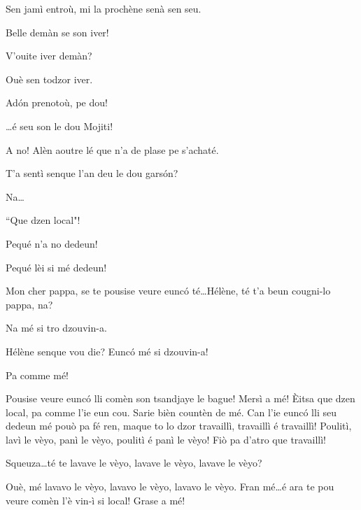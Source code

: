 \begin{drama}
\Louisspeaks Sen jamì entroù, mi la prochène senà sen seu.

\Pierrespeaks Belle demàn se son iver!

\Louisspeaks{} V'ouite iver demàn?

\Bertaspeaks Ouè sen todzor iver.

\Pierrespeaks Ad\'on prenotoù, pe dou!


\Helenespeaks \ldots é seu son le dou Mojiti!


\Pierrespeaks A no! Alèn aoutre lé que n'a de plase pe s'achaté.


\Bertaspeaks{} T'a sentì senque l'an deu le dou gars\'on?

\Helenespeaks Na\ldots

\Bertaspeaks{} ``Que dzen local"!

\Helenespeaks{} Pequé n'a no dedeun!

\Bertaspeaks{} Pequé lèi si mé dedeun!


\Bertaspeaks Mon cher pappa, se te pousise veure eunc\'o té\ldots Hélène, té t'a beun cougni-lo pappa, na?

\Helenespeaks Na mé si tro dzouvin-a.

\Bertaspeaks Hélène senque vou die? Eunc\'o mé si dzouvin-a!

\Helenespeaks Pa comme mé!

\Bertaspeaks{} Pousise veure eunc\'o lli comèn son tsandjaye le bague! Mersì a mé! \`Eitsa que dzen local, pa comme l'ie eun cou. Sarie bièn countèn de mé. Can l'ie eunc\'o lli seu dedeun mé pouò pa fé ren, maque to lo dzor travaillì, travaillì é travaillì! Poulitì, lavì le vèyo, panì le vèyo, poulitì é panì le vèyo! Fiò pa d'atro que travaillì!

\Helenespeaks{} Squeuza\ldots té te lavave le vèyo, lavave le vèyo, lavave le vèyo?

\Bertaspeaks Ouè, mé lavavo le vèyo, lavavo le vèyo, lavavo le vèyo. Fran mé\ldots é ara te pou veure comèn l'è vin-ì si local! Grase a mé!


\end{drama}
